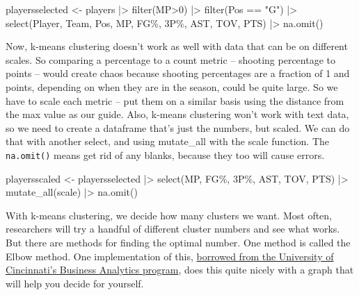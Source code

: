 \documentclass[
  letterpaper,
  DIV=11,
  numbers=noendperiod]{scrreprt}
\newenvironment{Shaded}{\begin{snugshade}}{\end{snugshade}}
\newcommand{\AttributeTok}[1]{\textcolor[rgb]{0.40,0.45,0.13}{#1}}
\newcommand{\DecValTok}[1]{\textcolor[rgb]{0.68,0.00,0.00}{#1}}
\newcommand{\FunctionTok}[1]{\textcolor[rgb]{0.28,0.35,0.67}{#1}}
\newcommand{\NormalTok}[1]{\textcolor[rgb]{0.00,0.23,0.31}{#1}}
\newcommand{\OtherTok}[1]{\textcolor[rgb]{0.00,0.23,0.31}{#1}}
\newcommand{\SpecialCharTok}[1]{\textcolor[rgb]{0.37,0.37,0.37}{#1}}
\newcommand{\StringTok}[1]{\textcolor[rgb]{0.13,0.47,0.30}{#1}}
\begin{document}
\begin{Shaded}
\begin{Highlighting}[]
\NormalTok{playersselected }\OtherTok{\textless{}{-}}\NormalTok{ players }\SpecialCharTok{|\textgreater{}} 
  \FunctionTok{filter}\NormalTok{(MP}\SpecialCharTok{\textgreater{}}\DecValTok{0}\NormalTok{) }\SpecialCharTok{|\textgreater{}} \FunctionTok{filter}\NormalTok{(Pos }\SpecialCharTok{==} \StringTok{"G"}\NormalTok{) }\SpecialCharTok{|\textgreater{}} 
  \FunctionTok{select}\NormalTok{(Player, Team, Pos, MP, }\StringTok{\textasciigrave{}}\AttributeTok{FG\%}\StringTok{\textasciigrave{}}\NormalTok{, }\StringTok{\textasciigrave{}}\AttributeTok{3P\%}\StringTok{\textasciigrave{}}\NormalTok{, AST, TOV, PTS) }\SpecialCharTok{|\textgreater{}} 
  \FunctionTok{na.omit}\NormalTok{() }
\end{Highlighting}
\end{Shaded}

Now, k-means clustering doesn't work as well with data that can be on
different scales. So comparing a percentage to a count metric --
shooting percentage to points -- would create chaos because shooting
percentages are a fraction of 1 and points, depending on when they are
in the season, could be quite large. So we have to scale each metric --
put them on a similar basis using the distance from the max value as our
guide. Also, k-means clustering won't work with text data, so we need to
create a dataframe that's just the numbers, but scaled. We can do that
with another select, and using mutate\_all with the scale function. The
\texttt{na.omit()} means get rid of any blanks, because they too will
cause errors.

\begin{Shaded}
\begin{Highlighting}[]
\NormalTok{playersscaled }\OtherTok{\textless{}{-}}\NormalTok{ playersselected }\SpecialCharTok{|\textgreater{}} 
  \FunctionTok{select}\NormalTok{(MP, }\StringTok{\textasciigrave{}}\AttributeTok{FG\%}\StringTok{\textasciigrave{}}\NormalTok{, }\StringTok{\textasciigrave{}}\AttributeTok{3P\%}\StringTok{\textasciigrave{}}\NormalTok{, AST, TOV, PTS) }\SpecialCharTok{|\textgreater{}} 
  \FunctionTok{mutate\_all}\NormalTok{(scale) }\SpecialCharTok{|\textgreater{}} 
  \FunctionTok{na.omit}\NormalTok{()}
\end{Highlighting}
\end{Shaded}

With k-means clustering, we decide how many clusters we want. Most
often, researchers will try a handful of different cluster numbers and
see what works. But there are methods for finding the optimal number.
One method is called the Elbow method. One implementation of this,
\href{https://uc-r.github.io/kmeans_clustering}{borrowed from the
University of Cincinnati's Business Analytics program}, does this quite
nicely with a graph that will help you decide for yourself.
\end{document}
